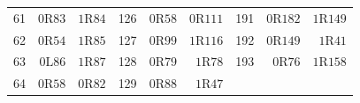 {\begin{longtable}{@{}rrrrrrrrr@{}}
61 & $0\mathrm{R}83$ & $1\mathrm{R}84$ & 126 & $0\mathrm{R}58$ & $0\mathrm{R}111$ & 191 & $0\mathrm{R}182$ & $1\mathrm{R}149$\\
62 & $0\mathrm{R}54$ & $1\mathrm{R}85$ & 127 & $0\mathrm{R}99$ & $1\mathrm{R}116$ & 192 & $0\mathrm{R}149$ & $1\mathrm{R}41$\\
63 & $0\mathrm{L}86$ & $1\mathrm{R}87$ & 128 & $0\mathrm{R}79$ & $1\mathrm{R}78$ & 193 & $0\mathrm{R}76$ & $1\mathrm{R}158$\\
64 & $0\mathrm{R}58$ & $0\mathrm{R}82$ & 129 & $0\mathrm{R}88$ & $1\mathrm{R}47$ &  &  & \\
\end{longtable}
}
